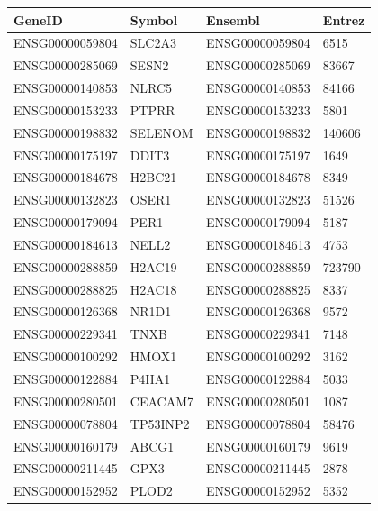 \begingroup
\tiny
\setlength{\tabcolsep}{2pt}
\renewcommand{\arraystretch}{1.18}
\begin{tabular}{@{}llll@{}}
\toprule
GeneID & Symbol & Ensembl & Entrez \\
\midrule
ENSG00000059804 & SLC2A3 & ENSG00000059804 & 6515 \\
ENSG00000285069 & SESN2 & ENSG00000285069 & 83667 \\
ENSG00000140853 & NLRC5 & ENSG00000140853 & 84166 \\
ENSG00000153233 & PTPRR & ENSG00000153233 & 5801 \\
ENSG00000198832 & SELENOM & ENSG00000198832 & 140606 \\
ENSG00000175197 & DDIT3 & ENSG00000175197 & 1649 \\
ENSG00000184678 & H2BC21 & ENSG00000184678 & 8349 \\
ENSG00000132823 & OSER1 & ENSG00000132823 & 51526 \\
ENSG00000179094 & PER1 & ENSG00000179094 & 5187 \\
ENSG00000184613 & NELL2 & ENSG00000184613 & 4753 \\
ENSG00000288859 & H2AC19 & ENSG00000288859 & 723790 \\
ENSG00000288825 & H2AC18 & ENSG00000288825 & 8337 \\
ENSG00000126368 & NR1D1 & ENSG00000126368 & 9572 \\
ENSG00000229341 & TNXB & ENSG00000229341 & 7148 \\
ENSG00000100292 & HMOX1 & ENSG00000100292 & 3162 \\
ENSG00000122884 & P4HA1 & ENSG00000122884 & 5033 \\
ENSG00000280501 & CEACAM7 & ENSG00000280501 & 1087 \\
ENSG00000078804 & TP53INP2 & ENSG00000078804 & 58476 \\
ENSG00000160179 & ABCG1 & ENSG00000160179 & 9619 \\
ENSG00000211445 & GPX3 & ENSG00000211445 & 2878 \\
ENSG00000152952 & PLOD2 & ENSG00000152952 & 5352 \\
\bottomrule
\end{tabular}
\endgroup

